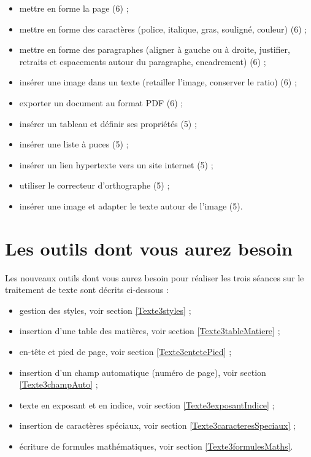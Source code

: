 \begin{itemize}
\item mettre en forme la page (6) ;
\item mettre en forme des caractères (police, italique, gras, souligné, couleur) (6) ;
\item mettre en forme des paragraphes (aligner à gauche ou à droite, justifier, retraits et espacements autour du paragraphe, encadrement) (6) ;
\item insérer une image dans un texte (retailler l'image, conserver le ratio) (6) ;
\item exporter un document au format PDF (6) ;
\item insérer un tableau et définir ses propriétés (5) ;
\item insérer une liste à puces (5) ;
\item insérer un lien hypertexte vers un site internet (5) ;
\item utiliser le correcteur d'orthographe (5) ;
\item insérer une image et adapter le texte autour de l'image (5).
\end{itemize}



\section{Les outils dont vous aurez besoin}\label{Texte4eOutils}

Les nouveaux outils dont vous aurez besoin pour réaliser les trois séances sur le traitement de texte sont décrits ci-dessous :


\begin{itemize}   
\item gestion des styles, voir section \vref{Texte3styles} ;
\item insertion d'une table des matières, voir section \vref{Texte3tableMatiere} ;
\item en-tête et pied de page, voir section \vref{Texte3entetePied} ;
\item insertion d'un champ automatique (numéro de page), voir section \vref{Texte3champAuto} ;
\item texte en exposant et en indice, voir section \vref{Texte3exposantIndice} ;
\item insertion de caractères spéciaux, voir section \vref{Texte3caracteresSpeciaux} ; 
\item écriture de formules mathématiques, voir section \vref{Texte3formulesMaths}. 
\end{itemize}  




